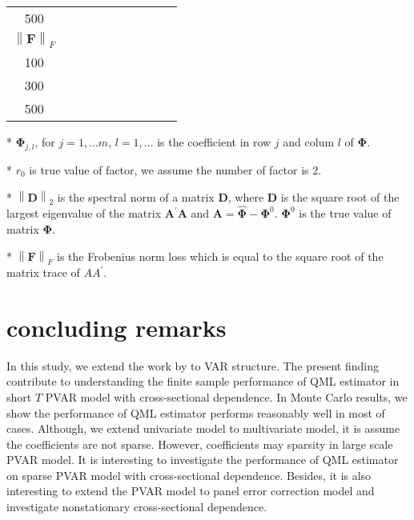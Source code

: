 \documentclass[12pt,a4paper,hyperref]{article}
\begin{document}
\begin{table}[H]
\begin{threeparttable}
\begin{tabular} {*{10}{c}}
500& &  &   &	  &	& & & &	  \\
\cmidrule(lr){1-10}
$\left\| \boldsymbol{F} \right\|_{F} $\\
\cmidrule(lr){1-4}   \cmidrule(lr){5-7}   \cmidrule(lr){8-10}
100&  & & &	  &	& & & &   \\
300&   &  & &	  &	&	& & &  \\
500& &  &   &	  &	& & & &	  \\
\bottomrule
\end{tabular}
\begin{tablenotes}
\footnotesize
  \item[*] $\boldsymbol{\Phi}_{j,l}$, for $j=1,\ldots m$, $l=1,\ldots$ is the coefficient in row $j$ and colum $l$ of $\boldsymbol{\Phi}$.
\item[*] $r_{0}$ is true value of factor, we assume the number of factor is $2$.
 \item[*] $\left\| \boldsymbol{D} \right\|_{2}$ is the spectral norm of a matrix $\boldsymbol{D}$, where $\boldsymbol{D}$ is the square root of the largest eigenvalue of the matrix $\boldsymbol{A}^{'}\boldsymbol{A}$ and $\boldsymbol{A}=\hat{\boldsymbol{\Phi}}- \boldsymbol{\Phi}^{0}$. $\boldsymbol{\Phi}^{0}$ is the true value of matrix $\boldsymbol{\Phi}$.
 \item[*] $\left\| \boldsymbol{F} \right\|_{F} $ is the Frobenius norm loss which is equal to the square root of the matrix trace of $AA^{'}$.
    \end{tablenotes}
\end{threeparttable}
\end{table}










\section{concluding remarks}
In this study, we extend the work by \citet{Hayakawa:2018} to VAR structure. The present finding contribute to understanding the finite sample performance of QML estimator in short $T$ PVAR model with cross-sectional dependence.
 In Monte Carlo results, we show the  performance of QML estimator performs reasonably well in most of cases. Although, we extend univariate model to multivariate model, it is assume the coefficients are not sparse. However, coefficients may sparsity in large scale PVAR model.  It is interesting to investigate the performance of QML estimator on sparse PVAR model with cross-sectional dependence.   Besides, it is also interesting to extend the PVAR model to panel error correction model and investigate nonstationary cross-sectional dependence.
\end{document}
